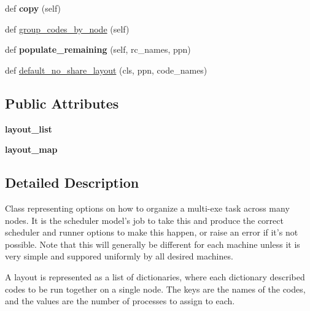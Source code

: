\begin{DoxyCompactItemize}
\mbox{\label{classcodar_1_1savanna_1_1node__layout_1_1_node_layout_aa3b19766879e91de1698bb47d7149809}} 
def {\bfseries copy} (self)
\item 
def \hyperlink{classcodar_1_1savanna_1_1node__layout_1_1_node_layout_a3f6f326ba64b563322c2b745775ab82b}{group\+\_\+codes\+\_\+by\+\_\+node} (self)
\item 
\mbox{\label{classcodar_1_1savanna_1_1node__layout_1_1_node_layout_addd066236434ca6fb9813fc50bcac973}} 
def {\bfseries populate\+\_\+remaining} (self, rc\+\_\+names, ppn)
\item 
def \hyperlink{classcodar_1_1savanna_1_1node__layout_1_1_node_layout_afa3112f3e4b98a1ad6f1c834dd81b2d7}{default\+\_\+no\+\_\+share\+\_\+layout} (cls, ppn, code\+\_\+names)
\end{DoxyCompactItemize}
\subsection*{Public Attributes}
\begin{DoxyCompactItemize}
\item 
\mbox{\label{classcodar_1_1savanna_1_1node__layout_1_1_node_layout_af27f209b198b9491d57d2bb3e65abc34}} 
{\bfseries layout\+\_\+list}
\item 
\mbox{\label{classcodar_1_1savanna_1_1node__layout_1_1_node_layout_a4bda626f4487b5078f83744cf7d32b7d}} 
{\bfseries layout\+\_\+map}
\end{DoxyCompactItemize}


\subsection{Detailed Description}
\begin{DoxyVerb}Class representing options on how to organize a multi-exe task across
many nodes. It is the scheduler model's job to take this and produce the
correct scheduler and runner options to make this happen, or raise an error
if it's not possible. Note that this will generally be different for each
machine unless it is very simple and suppored uniformly by all desired
machines.

A layout is represented as a list of dictionaries, where each dictionary
described codes to be run together on a single node. The keys are
the names of the codes, and the values are the number of processes to
assign to each.
\end{DoxyVerb}
 

